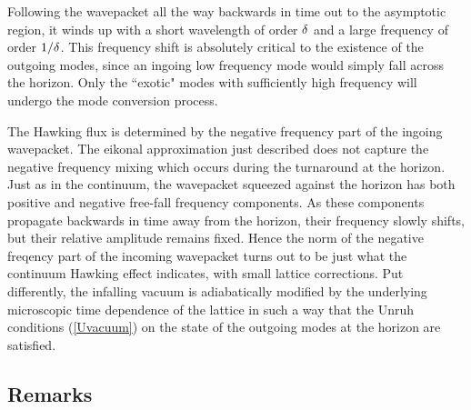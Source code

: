 \documentclass[12pt]{article}
\begin{document}
Following the wavepacket all the way backwards in time out
to the asymptotic region, it winds up with a short
wavelength of order $\delta$ and a large frequency  of order
$1/\delta$. This frequency shift is absolutely critical to the
existence of the outgoing modes, since an ingoing low
frequency mode would simply fall across the horizon. Only
the ``exotic" modes with sufficiently high frequency will
undergo the mode conversion process. 

The Hawking flux is determined by the negative
frequency part of the ingoing wavepacket. The eikonal approximation
just described does not capture the negative frequency mixing
which occurs during the turnaround at the horizon. Just as in the
continuum, the wavepacket squeezed against the horizon has
both positive and negative free-fall frequency components. 
As these components propagate backwards in time away from the horizon,
their frequency slowly shifts, but their relative amplitude remains
fixed. Hence the norm of the negative freqency part of the 
incoming wavepacket  turns out to be just what
the continuum Hawking effect indicates, with small lattice corrections.
Put differently, the infalling vacuum is adiabatically
modified by the underlying microscopic time dependence of the 
lattice in such a way that the Unruh conditions (\ref{Uvacuum}) on the 
state of the outgoing modes at the horizon are satisfied. 

\subsection{Remarks}
\end{document}
